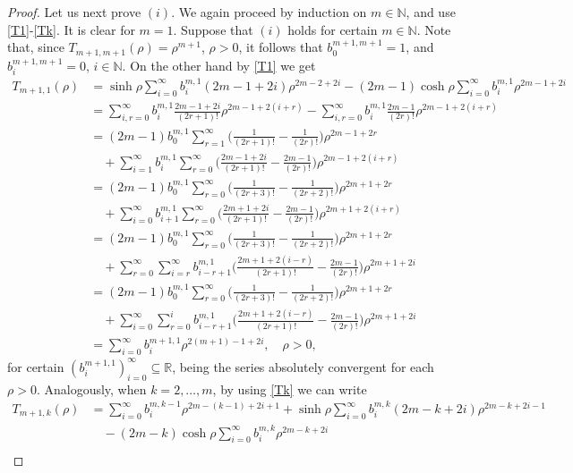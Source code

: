 \documentclass[10pt,a4paper]{amsart}
\begin{document}
\begin{proof}
Let us next prove $(i)$. We again proceed by induction on $m\in \mathbb N$, and use \eqref{T1}-\eqref{Tk}. It is clear for $m=1$. Suppose that $(i)$ holds for certain $m\in \mathbb N$. Note that, since $T_{m+1,m+1}(\rho )=\rho ^{m+1}$, $\rho >0$, it follows that $b_0^{m+1,m+1}=1$, and $b_i^{m+1,m+1}=0$, $i\in \mathbb N$. On the other hand by \eqref{T1} we get
\begin{align*}
    T_{m+1,1}(\rho )&=\sinh \rho \sum_{i=0}^\infty b_i^{m,1}(2m-1+2i)\rho ^{2m-2+2i}-(2m-1)\cosh \rho \sum_{i=0}^\infty b_i^{m,1}\rho ^{2m-1+2i}\\
    &=\sum_{i,r=0}^\infty b_i^{m,1}\frac{2m-1+2i}{(2r+1)!}\rho ^{2m-1+2(i+r)}-\sum_{i,r=0}^\infty b_i^{m,1}\frac{2m-1}{(2r)!}\rho ^{2m-1+2(i+r)}\\
    &=(2m-1)b_0^{m,1}\sum_{r=1}^\infty \Big(\frac{1}{(2r+1)!}-\frac{1}{(2r)!}\Big)\rho ^{2m-1+2r}\\
    &\quad +\sum_{i=1}^\infty b_i^{m,1}\sum_{r=0}^\infty \Big(\frac{2m-1+2i}{(2r+1)!}-\frac{2m-1}{(2r)!}\Big)\rho ^{2m-1+2(i+r)}\\
    &=(2m-1)b_0^{m,1}\sum_{r=0}^\infty \Big(\frac{1}{(2r+3)!}-\frac{1}{(2r+2)!}\Big)\rho ^{2m+1+2r}\\
    &\quad +\sum_{i=0}^\infty b_{i+1}^{m,1}\sum_{r=0}^\infty \Big(\frac{2m+1+2i}{(2r+1)!}-\frac{2m-1}{(2r)!}\Big)\rho ^{2m+1+2(i+r)}\\
     &=(2m-1)b_0^{m,1}\sum_{r=0}^\infty \Big(\frac{1}{(2r+3)!}-\frac{1}{(2r+2)!}\Big)\rho ^{2m+1+2r}\\
    &\quad +\sum_{r=0}^\infty \sum_{i=r}^\infty b_{i-r+1}^{m,1}\Big(\frac{2m+1+2(i-r)}{(2r+1)!}-\frac{2m-1}{(2r)!}\Big)\rho ^{2m+1+2i}\\
     &=(2m-1)b_0^{m,1}\sum_{r=0}^\infty \Big(\frac{1}{(2r+3)!}-\frac{1}{(2r+2)!}\Big)\rho ^{2m+1+2r}\\
    &\quad +\sum_{i=0}^\infty \sum_{r=0}^i b_{i-r+1}^{m,1}\Big(\frac{2m+1+2(i-r)}{(2r+1)!}-\frac{2m-1}{(2r)!}\Big)\rho ^{2m+1+2i}\\
    &=\sum_{i=0}^\infty b_i^{m+1,1}\rho ^{2(m+1)-1+2i},\quad \rho >0,
\end{align*}
for certain $(b_i^{m+1,1})_{i=0}^\infty \subseteq \mathbb R$, being the series absolutely convergent for each $\rho >0$. Analogously, when $k=2,\ldots, m$, by using \eqref{Tk} we can write
\begin{align*}
T_{m+1,k}(\rho )&=\sum_{i=0}^\infty b_i^{m,k-1}\rho ^{2m-(k-1)+2i+1}+\sinh \rho \sum_{i=0}^\infty b_i^{m,k}(2m-k+2i)\rho ^{2m-k+2i-1}\\
&\quad -(2m-k)\cosh \rho \sum_{i=0}^\infty b_i^{m,k}\rho ^{2m-k+2i} \\

\end{align*}
\end{proof}
\end{document}
